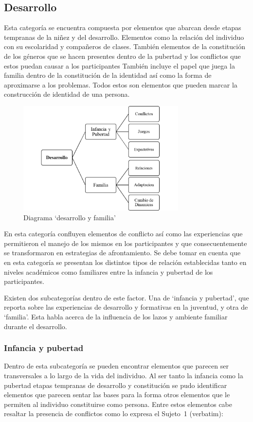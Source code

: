 \subsection{Desarrollo}
Esta categoría se encuentra compuesta por elementos que abarcan desde etapas
tempranas de la niñez y del desarrollo.
Elementos como la relación del individuo con su escolaridad y compañeros de
clases.
También elementos de la constitución de los géneros que se hacen presentes
dentro de la pubertad y los conflictos que estos puedan causar a los
participantes
También incluye el papel que juega la familia dentro de la constitución de la
identidad así como la forma de aproximarse a los problemas.
Todos estos son elementos que pueden marcar la construcción de identidad de una
persona.

\begin{figure}
    \centering
    \includegraphics[width=0.75\textwidth]{desarrollo}
    \caption{Diagrama ‘desarrollo y familia’}\label{fig:desarrollo}
\end{figure}

En esta categoría confluyen elementos de conflicto así como las experiencias que
permitieron el manejo de los mismos en los participantes y que
consecuentemente se transformaron en estrategias de afrontamiento. Se debe tomar
en cuenta que en esta categoría se presentan los distintos tipos de relación
establecidas tanto en niveles académicos como familiares entre la infancia y
pubertad de los participantes.

Existen dos subcategorías dentro de este factor. Una de ‘infancia y pubertad’,
que reporta sobre las experiencias de desarrollo y formativas en la juventud, y
otra de ‘familia’. Esta habla acerca de la influencia de los lazos y ambiente
familiar durante el desarrollo.

\subsubsection{Infancia y pubertad}
Dentro de esta subcategoría se pueden
encontrar elementos que parecen ser transversales a lo largo de la vida del
individuo. Al ser tanto la infancia como la pubertad etapas tempranas de
desarrollo y constitución se pudo identificar elementos que parecen sentar las
bases para la forma otros elementos que le permiten al individuo constituirse
como persona. Entre estos elementos cabe resaltar la presencia de conflictos
como lo expresa el Sujeto~1 (verbatim):

